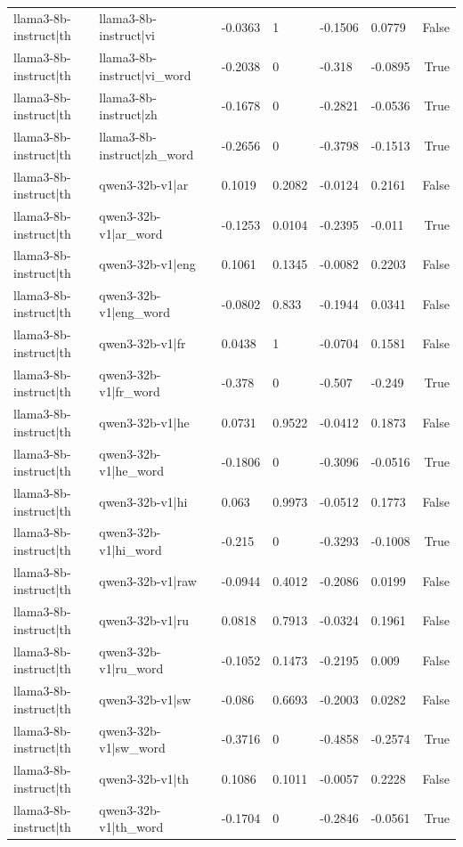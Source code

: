 \begin{table}
\begin{tabular}{llllllr}
llama3-8b-instruct|th & llama3-8b-instruct|vi & -0.0363 & 1 & -0.1506 & 0.0779 & False \\
llama3-8b-instruct|th & llama3-8b-instruct|vi_word & -0.2038 & 0 & -0.318 & -0.0895 & True \\
llama3-8b-instruct|th & llama3-8b-instruct|zh & -0.1678 & 0 & -0.2821 & -0.0536 & True \\
llama3-8b-instruct|th & llama3-8b-instruct|zh_word & -0.2656 & 0 & -0.3798 & -0.1513 & True \\
llama3-8b-instruct|th & qwen3-32b-v1|ar & 0.1019 & 0.2082 & -0.0124 & 0.2161 & False \\
llama3-8b-instruct|th & qwen3-32b-v1|ar_word & -0.1253 & 0.0104 & -0.2395 & -0.011 & True \\
llama3-8b-instruct|th & qwen3-32b-v1|eng & 0.1061 & 0.1345 & -0.0082 & 0.2203 & False \\
llama3-8b-instruct|th & qwen3-32b-v1|eng_word & -0.0802 & 0.833 & -0.1944 & 0.0341 & False \\
llama3-8b-instruct|th & qwen3-32b-v1|fr & 0.0438 & 1 & -0.0704 & 0.1581 & False \\
llama3-8b-instruct|th & qwen3-32b-v1|fr_word & -0.378 & 0 & -0.507 & -0.249 & True \\
llama3-8b-instruct|th & qwen3-32b-v1|he & 0.0731 & 0.9522 & -0.0412 & 0.1873 & False \\
llama3-8b-instruct|th & qwen3-32b-v1|he_word & -0.1806 & 0 & -0.3096 & -0.0516 & True \\
llama3-8b-instruct|th & qwen3-32b-v1|hi & 0.063 & 0.9973 & -0.0512 & 0.1773 & False \\
llama3-8b-instruct|th & qwen3-32b-v1|hi_word & -0.215 & 0 & -0.3293 & -0.1008 & True \\
llama3-8b-instruct|th & qwen3-32b-v1|raw & -0.0944 & 0.4012 & -0.2086 & 0.0199 & False \\
llama3-8b-instruct|th & qwen3-32b-v1|ru & 0.0818 & 0.7913 & -0.0324 & 0.1961 & False \\
llama3-8b-instruct|th & qwen3-32b-v1|ru_word & -0.1052 & 0.1473 & -0.2195 & 0.009 & False \\
llama3-8b-instruct|th & qwen3-32b-v1|sw & -0.086 & 0.6693 & -0.2003 & 0.0282 & False \\
llama3-8b-instruct|th & qwen3-32b-v1|sw_word & -0.3716 & 0 & -0.4858 & -0.2574 & True \\
llama3-8b-instruct|th & qwen3-32b-v1|th & 0.1086 & 0.1011 & -0.0057 & 0.2228 & False \\
llama3-8b-instruct|th & qwen3-32b-v1|th_word & -0.1704 & 0 & -0.2846 & -0.0561 & True \\

\end{tabular}
\end{table}
